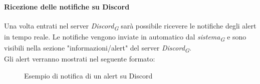 \paragraph{Ricezione delle notifiche su Discord}
Una volta entrati nel server \textit{Discord}\textsubscript{\textit{G}} sarà possibile ricevere le notifiche degli alert in tempo reale. Le notifiche vengono inviate in automatico dal \textit{sistema}\textsubscript{\textit{G}} e sono visibili nella sezione "informazioni/alert" del server \textit{Discord}\textsubscript{\textit{G}}. \\
Gli alert verranno mostrati nel seguente formato:
\begin{figure}[H]
    \centering
    \caption{Esempio di notifica di un alert su Discord}
    \label{fig:my_label}
\end{figure}